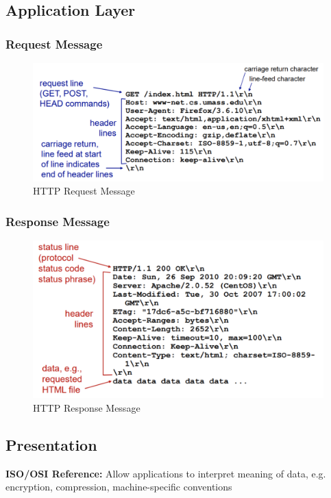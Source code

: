 \subsection{Application Layer}
\subsubsection{Request Message}
\begin{figure}[H]
	\includegraphics[width=\linewidth]{request}
	\centering
	\caption{HTTP Request Message}
\end{figure}
\subsubsection{Response Message}
\begin{figure}[H]
	\includegraphics[width=\linewidth]{response}
	\centering
	\caption{HTTP Response Message}
\end{figure}

\subsection{Presentation}
\textbf{ISO/OSI Reference:} Allow applications to interpret meaning of data, e.g. encryption, compression, machine-specific conventions
